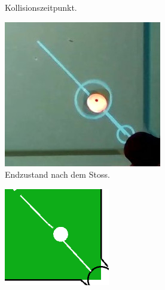 \begin{figure}[h!]
\begin{subfigure}[t]{0.2\textwidth}
        \caption{Kollisionszeitpunkt.}
        \label{fig:video_13_0030_0034_collision}
    \end{subfigure}
    \hfill
    \begin{subfigure}[t]{0.2\textwidth}
        \centering
        \includegraphics[width=1.0\linewidth]{../common/04_results/resources/simulation_vs_reality/video_13_0030_0034_end_cut.jpg}
        \caption{Endzustand nach dem Stoss.}
        \label{fig:video_13_0030_0034_end}
    \end{subfigure}
    \hfill
    \begin{subfigure}[t]{0.2\textwidth}
        \centering
        \includegraphics[width=1.0\linewidth]{../common/04_results/resources/simulation_vs_reality/video_13_0030_0034_simulation_cut.png}

\end{subfigure}
\end{figure}
